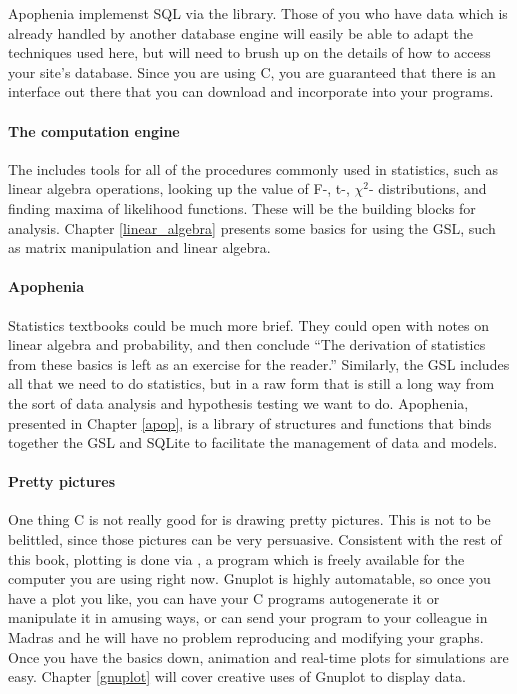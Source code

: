 Apophenia implemenst SQL via the  library.
Those of you who 
have data which is already handled
by another database engine will easily be able to adapt the techniques
used here, but will need to brush up on the details of how to access
your site's database. Since you are using C,
you are guaranteed that there is an interface out there that you can
download and incorporate into your programs.

\paragraph{The computation engine} The 
includes tools for all of the procedures commonly used in statistics,
such as linear algebra operations, looking up the value of F-, t-, $\chi^2$-
distributions, and finding maxima of likelihood functions. These
will be the building blocks for analysis. Chapter \ref{linear_algebra}
presents some basics for using the GSL, such as matrix manipulation and
linear algebra.

\paragraph{Apophenia}
Statistics textbooks could be much more brief. They could open
with notes on linear algebra and probability, and then conclude ``The
derivation of statistics from these basics is left as an exercise for
the reader.'' Similarly, the GSL includes all that we need to do
statistics, but in a raw form that is still a long way from the
sort of data analysis and hypothesis testing we want to do. Apophenia,
presented in Chapter \ref{apop}, is a library of structures and functions
that binds together the GSL and SQLite to facilitate the management of
data and models.

\paragraph{Pretty pictures} One thing C is not really good for is drawing
pretty pictures. This is not to be belittled, since those pictures
can be very persuasive. Consistent with the rest of this book, plotting
is done via , a program which is freely available for
the computer you are using right now. Gnuplot is highly automatable, so once
you have a plot you like, you can have your C programs autogenerate
it or manipulate it in amusing ways, or can send your program to your
colleague in Madras and he will have no problem reproducing and modifying
your graphs. Once you have the basics down, animation and real-time
plots for simulations are easy. Chapter \ref{gnuplot} will cover creative uses of
Gnuplot to display data.


